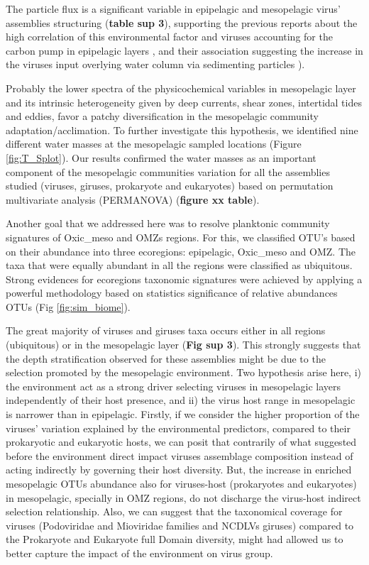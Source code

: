 \documentclass[fleqn,10pt]{wlscirep}
\begin{document}
The particle flux is a significant variable in epipelagic and mesopelagic virus’ assemblies structuring (\textbf{table sup 3}), supporting the previous reports about the high correlation of this environmental factor and viruses accounting for the carbon pump in epipelagic layers \cite{guidi_plankton_2016}, and their association suggesting the increase in the viruses input overlying water column via sedimenting particles \cite{parada_viral_2007}).

Probably the lower spectra of the physicochemical variables in mesopelagic layer and its intrinsic heterogeneity given by deep currents, shear zones, intertidal tides and eddies, favor a patchy diversification in the mesopelagic community adaptation/acclimation. To further investigate this hypothesis, we identified nine different water masses at the mesopelagic sampled locations (Figure \ref{fig:T_Splot}). Our results confirmed the water masses as an important component of the mesopelagic communities variation for all the assemblies studied (viruses, giruses, prokaryote and eukaryotes) based on permutation multivariate analysis (PERMANOVA) (\textbf{figure xx table}).

Another goal that we addressed here was to resolve planktonic community signatures of Oxic\_meso and OMZs regions. For this, we classified OTU’s based on their abundance into three ecoregions: epipelagic, Oxic\_meso and OMZ. The taxa that were equally abundant in all the regions were classified as ubiquitous. Strong evidences for ecoregions taxonomic signatures were achieved by applying a powerful methodology based on statistics significance of relative abundances OTUs (Fig \ref{fig:sim_biome}).

The great majority of viruses and giruses taxa occurs either in all regions (ubiquitous) or in the mesopelagic layer (\textbf{Fig sup 3}). This strongly suggests that the depth stratification observed for these assemblies might be due to the selection promoted by the mesopelagic environment. Two hypothesis arise here, i) the environment act as a strong driver selecting viruses in mesopelagic layers independently of their host presence, and ii) the virus host range in mesopelagic is narrower than in epipelagic. Firstly, if we consider the higher proportion of the viruses’ variation explained by the environmental predictors, compared to their prokaryotic and eukaryotic hosts, we can posit that contrarily of what suggested before the environment direct impact viruses assemblage composition instead of acting indirectly by governing their host diversity. But, the increase in enriched mesopelagic OTUs abundance also for viruses-host (prokaryotes and eukaryotes) in mesopelagic, specially in OMZ regions, do not discharge the virus-host indirect selection relationship. Also, we can suggest that the taxonomical coverage for viruses (Podoviridae and Mioviridae families and NCDLVs giruses) compared to the Prokaryote and Eukaryote full Domain diversity, might had allowed us to better capture the impact of the environment on virus group.
\end{document}
